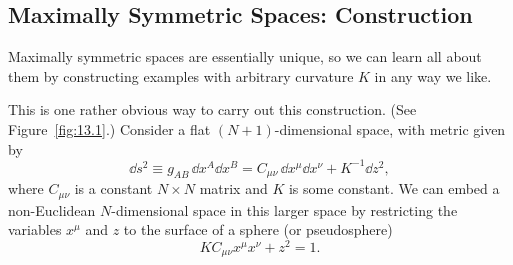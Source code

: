 
\subsection{Maximally Symmetric Spaces: Construction}\label{sec:13.3}

Maximally symmetric spaces are essentially unique, so we can learn all about
them by constructing examples with arbitrary curvature \(K\) in any way we
like.

This is one rather obvious way to carry out this construction. (See
Figure~\ref{fig:13.1}.) Consider a flat \((N+1)\)-dimensional space, with
metric given by
\begin{equation}
  \dd s^2
  \equiv
  g_{AB}\,\dd x^A\dd x^B
  =
  C_{\mu\nu}\,\dd x^\mu\dd x^\nu+K^{-1}\dd z^2,
  \tag{13.3.1}\label{eq:13.3.1}
\end{equation}
where \(C_{\mu\nu}\) is a constant \(N\times N\) matrix and \(K\) is some
constant. We can embed a non-Euclidean \(N\)-dimensional space in this larger
space by restricting the variables \(x^\mu\) and \(z\) to the surface of a
sphere (or pseudosphere)
\begin{equation}
  K C_{\mu\nu}x^\mu x^\nu+z^2=1.
  \tag{13.3.2}\label{eq:13.3.2}
\end{equation}

